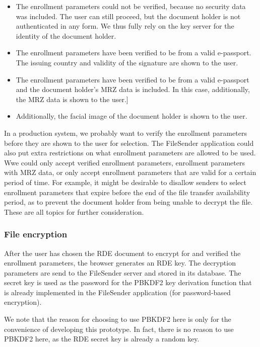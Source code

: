 \begin{itemize}
    \item The enrollment parameters could not be verified, because no security data was included.
    The user can still proceed, but the document holder is not authenticated in any form.
    We thus fully rely on the key server for the identity of the document holder.
    \item The enrollment parameters have been verified to be from a valid e-passport.
    The issuing country and validity of the signature are shown to the user.
    \item The enrollment parameters have been verified to be from a valid e-passport and the document holder's MRZ data is included.
    In this case, additionally, the MRZ data is shown to the user.]
    \item Additionally, the facial image of the document holder is shown to the user.
\end{itemize}

In a production system, we probably want to verify the enrollment parameters before they are shown to the user for selection.
The FileSender application could also put extra restrictions on what enrollment parameters are allowed to be used.
Wwe could only accept verified enrollment parameters, enrollment parameters with MRZ data, or only accept enrollment parameters that are valid for a certain period of time.
For example, it might be desirable to disallow senders to select enrollment parameters that expire before the end of the file transfer availability period, as to prevent the document holder from being unable to decrypt the file.
These are all topics for further consideration.

\subsubsection{File encryption}
After the user has chosen the RDE document to encrypt for and verified the enrollment parameters, the browser generates an RDE key.
The decryption parameters are send to the FileSender server and stored in its database.
The secret key is used as the password for the PBKDF2 key derivation function that is already implemented in the FileSender application (for password-based encryption).

We note that the reason for choosing to use PBKDF2 here is only for the convenience of developing this prototype.
In fact, there is no reason to use PBKDF2 here, as the RDE secret key is already a random key.

